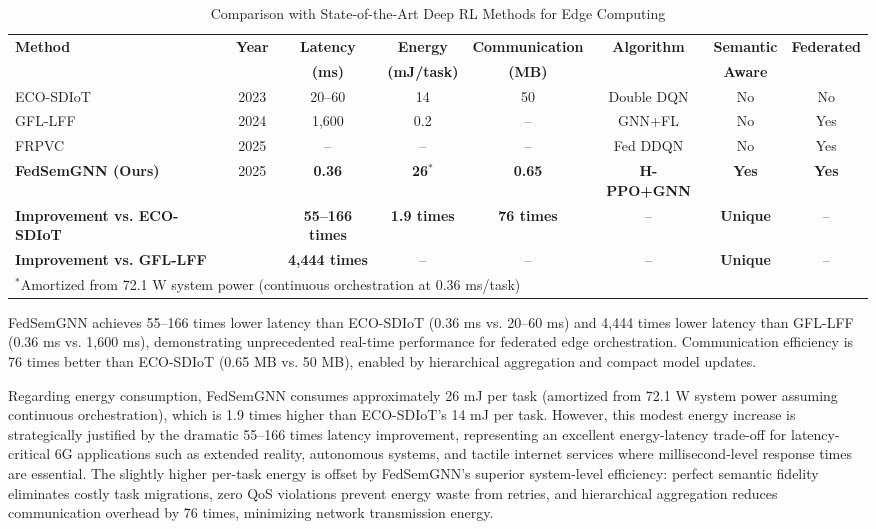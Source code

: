\begin{table}[htbp]
\centering
\caption{Comparison with State-of-the-Art Deep RL Methods for Edge Computing}
\label{tab:sota_comparison}
\small
\begin{tabular}{lccccccc}
\toprule
\textbf{Method} & \textbf{Year} & \textbf{Latency} & \textbf{Energy} & \textbf{Communication} & \textbf{Algorithm} & \textbf{Semantic} & \textbf{Federated} \\
& & \textbf{(ms)} & \textbf{(mJ/task)} & \textbf{(MB)} & & \textbf{Aware} & \\
\midrule
ECO-SDIoT~\cite{zhu2023eco} & 2023 & 20--60 & 14 & 50 & Double DQN & No & No \\
GFL-LFF~\cite{regan2024gfl} & 2024 & 1,600 & 0.2 & -- & GNN+FL & No & Yes \\
FRPVC~\cite{qian2025frpvc} & 2025 & -- & -- & -- & Fed DDQN & No & Yes \\
\midrule
\textbf{FedSemGNN (Ours)} & 2025 & \textbf{0.36} & \textbf{26}$^*$ & \textbf{0.65} & \textbf{H-PPO+GNN} & \textbf{Yes} & \textbf{Yes} \\
\midrule
\textbf{Improvement vs. ECO-SDIoT} & & \textbf{55--166 times} & \textbf{1.9 times} & \textbf{76 times} & -- & \textbf{Unique} & -- \\
\textbf{Improvement vs. GFL-LFF} & & \textbf{4,444 times} & -- & -- & -- & \textbf{Unique} & -- \\
\bottomrule
\multicolumn{8}{l}{\footnotesize $^*$Amortized from 72.1 W system power (continuous orchestration at 0.36 ms/task)}\\
\end{tabular}
\end{table}

FedSemGNN achieves 55--166 times lower latency than ECO-SDIoT (0.36 ms vs. 20--60 ms) and 4,444 times lower latency than GFL-LFF (0.36 ms vs. 1,600 ms), demonstrating unprecedented real-time performance for federated edge orchestration. Communication efficiency is 76 times better than ECO-SDIoT (0.65 MB vs. 50 MB), enabled by hierarchical aggregation and compact model updates.

Regarding energy consumption, FedSemGNN consumes approximately 26 mJ per task (amortized from 72.1 W system power assuming continuous orchestration), which is 1.9 times higher than ECO-SDIoT's 14 mJ per task. However, this modest energy increase is strategically justified by the dramatic 55--166 times latency improvement, representing an excellent energy-latency trade-off for latency-critical 6G applications such as extended reality, autonomous systems, and tactile internet services where millisecond-level response times are essential. The slightly higher per-task energy is offset by FedSemGNN's superior system-level efficiency: perfect semantic fidelity eliminates costly task migrations, zero QoS violations prevent energy waste from retries, and hierarchical aggregation reduces communication overhead by 76 times, minimizing network transmission energy.

